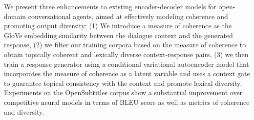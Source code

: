 We present three enhancements to existing encoder-decoder models for open-domain conversational agents, aimed at effectively modeling coherence and promoting output diversity: (1) We introduce a measure of coherence as the GloVe embedding similarity between the dialogue context and the generated response, (2) we filter our training corpora based on the measure of coherence to obtain topically coherent and lexically diverse context-response pairs, (3) we then train a response generator using a conditional variational autoencoder model that incorporates the measure of coherence as a latent variable and uses a context gate to guarantee topical consistency with the context and promote lexical diversity. Experiments on the OpenSubtitles corpus show a substantial improvement over competitive neural models in terms of BLEU score as well as metrics of coherence and diversity.
